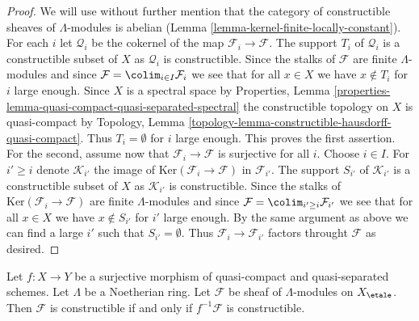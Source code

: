 \begin{proof}
We will use without further mention that the category of
constructible sheaves of $\Lambda$-modules is abelian
(Lemma \ref{lemma-kernel-finite-locally-constant}).
For each $i$ let $\mathcal{Q}_i$ be the cokernel of the map
$\mathcal{F}_i \to \mathcal{F}$. The support $T_i$ of $\mathcal{Q}_i$
is a constructible subset of $X$ as $\mathcal{Q}_i$ is constructible.
Since the stalks of $\mathcal{F}$ are finite $\Lambda$-modules
and since $\mathcal{F} = \colim_{i \in I} \mathcal{F}_i$ we see
that for all $x \in X$ we have $x \not \in T_i$ for $i$ large enough.
Since $X$ is a spectral space by Properties, Lemma
\ref{properties-lemma-quasi-compact-quasi-separated-spectral}
the constructible topology on $X$ is quasi-compact by
Topology, Lemma \ref{topology-lemma-constructible-hausdorff-quasi-compact}.
Thus $T_i = \emptyset$ for $i$ large enough. This proves the first
assertion. For the second, assume now that
$\mathcal{F}_i \to \mathcal{F}$ is surjective for all $i$.
Choose $i \in I$. For $i' \geq i$ denote $\mathcal{K}_{i'}$ the
image of $\text{Ker}(\mathcal{F}_i \to \mathcal{F})$ in $\mathcal{F}_{i'}$.
The support $S_{i'}$ of $\mathcal{K}_{i'}$
is a constructible subset of $X$ as $\mathcal{K}_{i'}$ is constructible.
Since the stalks of $\text{Ker}(\mathcal{F}_i \to \mathcal{F})$
are finite $\Lambda$-modules and since
$\mathcal{F} = \colim_{i' \geq i} \mathcal{F}_{i'}$ we see
that for all $x \in X$ we have $x \not \in S_{i'}$ for $i'$ large enough.
By the same argument as above we can find a large $i'$ such
that $S_{i'} = \emptyset$. Thus $\mathcal{F}_i \to \mathcal{F}_{i'}$
factors throught $\mathcal{F}$ as desired.
\end{proof}

\begin{lemma}
\label{lemma-check-constructible}
Let $f : X \to Y$ be a surjective morphism of quasi-compact and
quasi-separated schemes. Let $\Lambda$ be a Noetherian ring.
Let $\mathcal{F}$ be sheaf of $\Lambda$-modules on $X_\etale$.
Then $\mathcal{F}$ is constructible if and only if $f^{-1}\mathcal{F}$
is constructible.
\end{lemma}

